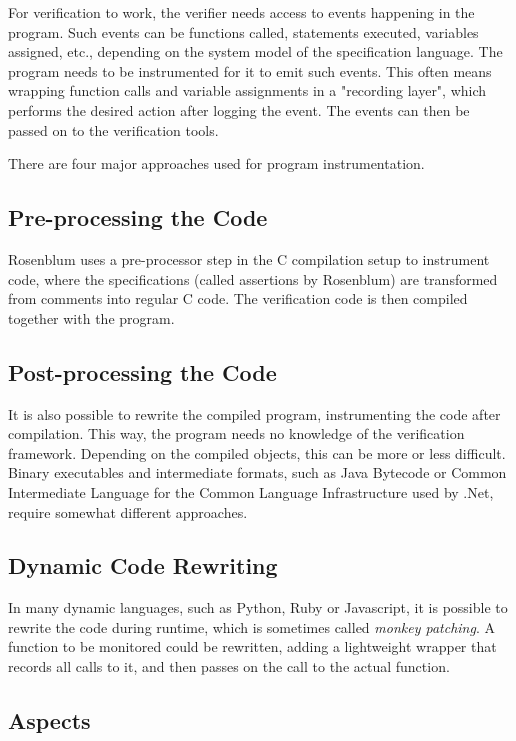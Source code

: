 \documentclass[a4paper,11pt]{kth-mag}
\begin{document}
For verification to work, the verifier needs access to events happening in the
program. Such events can be functions called, statements executed, variables
assigned, etc., depending on the system model of the specification language.
The program needs to be instrumented for it to emit such events. This often
means wrapping function calls and variable assignments in a "recording layer",
which performs the desired action after logging the event. The events can then
be passed on to the verification tools.

There are four major approaches used for program instrumentation.


\subsection{Pre-processing the Code}

Rosenblum \cite{rosenblum95practicalassertions} uses a pre-processor step in
the C compilation setup to instrument code, where the specifications (called
assertions by Rosenblum) are transformed from comments into regular C code. The
verification code is then compiled together with the program.


\subsection{Post-processing the Code}

It is also possible to rewrite the compiled program, instrumenting the code
after compilation. This way, the program needs no knowledge of the verification
framework. Depending on the compiled objects, this can be more or less
difficult. Binary executables and intermediate formats, such as Java Bytecode
or Common Intermediate Language for the Common Language Infrastructure used by
.Net, require somewhat different approaches.


\subsection{Dynamic Code Rewriting}

In many dynamic languages, such as Python, Ruby or Javascript, it is possible
to rewrite the code during runtime, which is sometimes called \textit{monkey
patching}. A function to be monitored could be rewritten, adding a lightweight
wrapper that records all calls to it, and then passes on the call to the actual
function.


\subsection{Aspects} \label{section-aspects}
\end{document}
